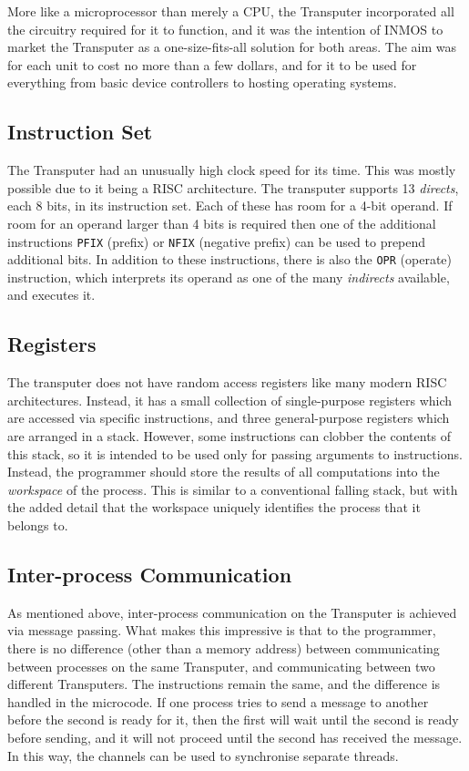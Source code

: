 More like a microprocessor than merely a CPU, the Transputer incorporated all
the circuitry required for it to function, and it was the intention of INMOS to
market the Transputer as a one-size-fits-all solution for both areas. The aim
was for each unit to cost no more than a few dollars, and for it to be used for
everything from basic device controllers to hosting operating systems.

\subsection{Instruction Set} \label{ops}

The Transputer had an unusually high clock speed for its time. This was mostly
possible due to it being a RISC architecture. The transputer supports 13
\textit{\gls{direct}s}, each 8 bits, in its instruction set. Each of these
has room for a 4-bit operand. If room for an operand larger than 4 bits is
required then one of the additional instructions \texttt{PFIX} (prefix) or
\texttt{NFIX} (negative prefix) can be used to prepend additional bits. In
addition to these instructions, there is also the \texttt{OPR} (operate)
instruction, which interprets its operand as one of the many
\textit{\gls{indirect}s} available, and executes it.

\subsection{Registers}

The transputer does not have random access registers like many modern RISC
architectures. Instead, it has a small collection of single-purpose registers
which are accessed via specific instructions, and three general-purpose
registers which are arranged in a stack. However, some instructions can clobber
the contents of this stack, so it is intended to be used only for passing
arguments to instructions. Instead, the programmer should store the results of
all computations into the \textit{\gls{workspace}} of the process. This is
similar to a conventional falling stack, but with the added detail that the
workspace uniquely identifies the process that it belongs to.

\subsection{Inter-process Communication}

As mentioned above, inter-process communication on the Transputer is achieved
via message passing. What makes this impressive is that to the programmer, there
is no difference (other than a memory address) between communicating between
processes on the same Transputer, and communicating between two different
Transputers. The instructions remain the same, and the difference is handled in
the microcode. If one process tries to send a message to another before the
second is ready for it, then the first will wait until the second is ready
before sending, and it will not proceed until the second has received the
message. In this way, the channels can be used to synchronise separate threads.

